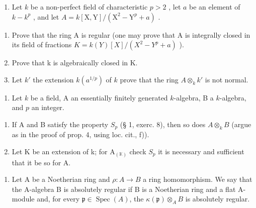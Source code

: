 
\begin{enumerate}
\def\labelenumi{\arabic{enumi})}
\tightlist
\item
  Let \(k\) be a non-perfect field of characteristic \(p > 2\) , let \(a\) be an element of \(k - k^p\) , and let \(A = k[\mathrm{X},\mathrm{Y}] / (\mathrm{X}^2 -\mathrm{Y}^p +a)\) .
\end{enumerate}

\begin{enumerate}
\def\labelenumi{\alph{enumi})}
\item
  Prove that the ring A is regular (one may prove that A is integrally closed in its field of fractions \(K = k(Y)[X]/(X^{2} - Y^{p} + a)\) ).
\item
  Prove that k is algebraically closed in K.
\item
  Let \(k'\) the extension \(k(a^{1/p})\) of \(k\) prove that the ring \(A \otimes_k k'\) is not normal.
\end{enumerate}

\begin{enumerate}
\def\labelenumi{\arabic{enumi})}
\setcounter{enumi}{1}
\tightlist
\item
  Let \(k\) be a field, A an essentially finitely generated \(k\)-algebra, B a \(k\)-algebra, and \(p\) an integer.
\end{enumerate}

\begin{enumerate}
\def\labelenumi{\alph{enumi})}
\item
  If A and B satisfy the property \(S_{p}\) (§ 1, exerc. 8), then so does \(A \otimes_{k} B\) (argue as in the proof of prop. 4, using loc. cit., f)).
\item
  Let K be an extension of k; for \(\mathrm{A}_{(\mathbb{K})}\) check \(S_{p}\) it is necessary and sufficient that it be so for A.
\end{enumerate}

\begin{enumerate}
\def\labelenumi{\arabic{enumi})}
\setcounter{enumi}{2}
\tightlist
\item
  Let A be a Noetherian ring and \(\rho : A \to B\) a ring homomorphism. We say that the A-algebra B is absolutely regular if B is a Noetherian ring and a flat A-module and, for every \(\mathfrak{p} \in \operatorname{Spec}(A)\), the \(\kappa(\mathfrak{p}) \otimes_{A} B\) is absolutely regular.
\end{enumerate}

